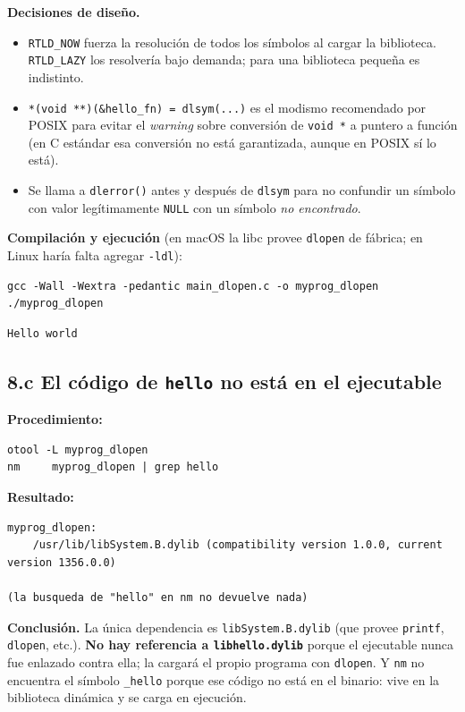 \documentclass[11pt,a4paper]{article}
\begin{document}
\textbf{Decisiones de diseño.}
\begin{itemize}[leftmargin=*]
    \item \texttt{RTLD\_NOW} fuerza la resolución de todos los
        símbolos al cargar la biblioteca. \texttt{RTLD\_LAZY} los
        resolvería bajo demanda; para una biblioteca pequeña es
        indistinto.
    \item \texttt{*(void **)(\&hello\_fn) = dlsym(...)} es el modismo
        recomendado por POSIX para evitar el \emph{warning} sobre
        conversión de \texttt{void *} a puntero a función (en C
        estándar esa conversión no está garantizada, aunque en POSIX
        sí lo está).
    \item Se llama a \texttt{dlerror()} antes y después de
        \texttt{dlsym} para no confundir un símbolo con valor
        legítimamente \texttt{NULL} con un símbolo \emph{no
        encontrado}.
\end{itemize}

\textbf{Compilación y ejecución}
(en macOS la libc provee \texttt{dlopen} de fábrica;
en Linux haría falta agregar \texttt{-ldl}):

\begin{lstlisting}
gcc -Wall -Wextra -pedantic main_dlopen.c -o myprog_dlopen
./myprog_dlopen
\end{lstlisting}

\begin{lstlisting}[style=outstyle]
Hello world
\end{lstlisting}

\subsection*{8.c El código de \texttt{hello} no está en el ejecutable}

\textbf{Procedimiento:}

\begin{lstlisting}
otool -L myprog_dlopen
nm     myprog_dlopen | grep hello
\end{lstlisting}

\textbf{Resultado:}

\begin{lstlisting}[style=outstyle]
myprog_dlopen:
    /usr/lib/libSystem.B.dylib (compatibility version 1.0.0, current version 1356.0.0)

(la busqueda de "hello" en nm no devuelve nada)
\end{lstlisting}

\textbf{Conclusión.} La única dependencia es
\texttt{libSystem.B.dylib} (que provee \texttt{printf},
\texttt{dlopen}, etc.). \textbf{No hay referencia a
\texttt{libhello.dylib}} porque el ejecutable nunca fue enlazado
contra ella; la cargará el propio programa con \texttt{dlopen}. Y
\texttt{nm} no encuentra el símbolo \texttt{\_hello} porque ese código
no está en el binario: vive en la biblioteca dinámica y se carga en
ejecución.
\end{document}
